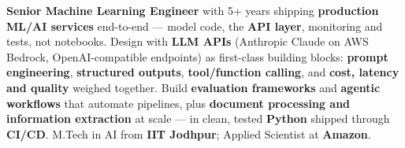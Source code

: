 \documentclass[letter,10pt]{article}
\begin{document}

\textbf{Senior Machine Learning Engineer} with 5+ years shipping \textbf{production ML/AI services} end-to-end --- model code, the \textbf{API layer}, monitoring and tests, not notebooks.
Design with \textbf{LLM APIs} (Anthropic Claude on AWS Bedrock, OpenAI-compatible endpoints) as first-class building blocks: \textbf{prompt engineering}, \textbf{structured outputs}, \textbf{tool/function calling}, and \textbf{cost, latency and quality} weighed together.
Build \textbf{evaluation frameworks} and \textbf{agentic workflows} that automate pipelines, plus \textbf{document processing and information extraction} at scale --- in clean, tested \textbf{Python} shipped through \textbf{CI/CD}.
M.Tech in AI from \textbf{IIT Jodhpur}; Applied Scientist at \textbf{Amazon}.
\end{document}
